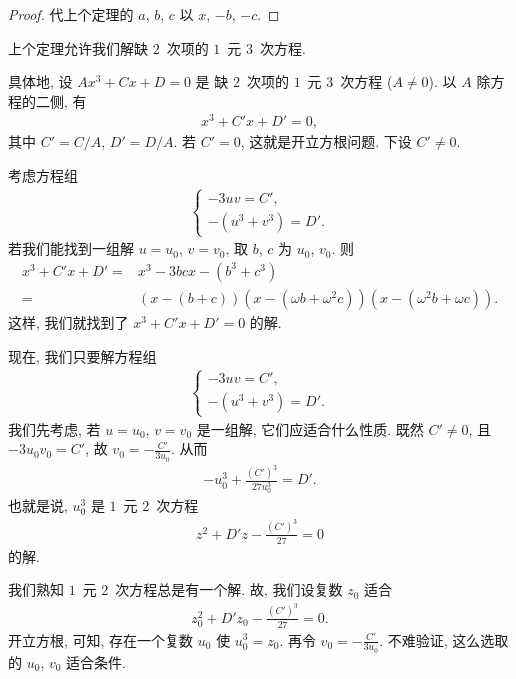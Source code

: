 \documentclass[%
    UTF8,%
    fontset=none,%
    punct=kaiming,%
    zihao=-4,%
    a4paper,%
    oneside,%
]{ctexbook}
\begin{document}
\begin{proof}
    代上个定理的 \(a\), \(b\), \(c\)
    以 \(x\), \(-b\), \(-c\).
\end{proof}

上个定理允许我们解缺 \(2\)~次项的 \(1\)~元 \(3\)~次方程.

具体地, 设 \(Ax^3 + Cx + D = 0\) 是%
缺 \(2\)~次项的 \(1\)~元 \(3\)~次方程
(\(A \neq 0\)).
以 \(A\) 除方程的二侧, 有
\begin{align*}
    x^3 + C'x + D' = 0,
\end{align*}
其中 \(C' = C/A\), \(D' = D/A\).
若 \(C' = 0\), 这就是开立方根问题.
下设 \(C' \neq 0\).

考虑方程组
\begin{align*}
    \begin{cases}
        -3uv = C', \\
        -(u^3 + v^3) = D'.
    \end{cases}
\end{align*}
若我们能找到一组解 \(u = u_0\), \(v = v_0\),
取 \(b\), \(c\) 为 \(u_0\), \(v_0\).
则
\begin{align*}
    x^3 + C'x + D'
    = {} & x^3 - 3bcx - (b^3 + c^3)                   \\
    = {} & (x - (b + c))(x - (\omega b + \omega^2 c))
    (x - (\omega^2 b + \omega c)).
\end{align*}
这样, 我们就找到了 \(x^3 + C'x + D' = 0\) 的解.

现在, 我们只要解方程组
\begin{align*}
    \begin{cases}
        -3uv = C', \\
        -(u^3 + v^3) = D'.
    \end{cases}
\end{align*}
我们先考虑, 若 \(u = u_0\), \(v = v_0\)
是一组解, 它们应适合什么性质.
既然 \(C' \neq 0\),
且 \(-3u_0 v_0 = C'\),
故 \(v_0 = -\frac{C'}{3u_0}\).
从而
\begin{align*}
    -u_0^3 + \frac{(C')^3}{27u_0^3} = D'.
\end{align*}
也就是说, \(u_0^3\) 是 \(1\)~元 \(2\)~次方程
\begin{align*}
    z^2 + D'z - \frac{(C')^3}{27} = 0
\end{align*}
的解.

我们熟知 \(1\)~元 \(2\)~次方程总是有一个解.
故, 我们设复数 \(z_0\) 适合
\begin{align*}
    z_0^2 + D'z_0 - \frac{(C')^3}{27} = 0.
\end{align*}
开立方根, 可知, 存在一个复数 \(u_0\)
使 \(u_0^3 = z_0\).
再令 \(v_0 = -\frac{C'}{3u_0}\).
不难验证, 这么选取的 \(u_0\), \(v_0\)
适合条件.
\end{document}

